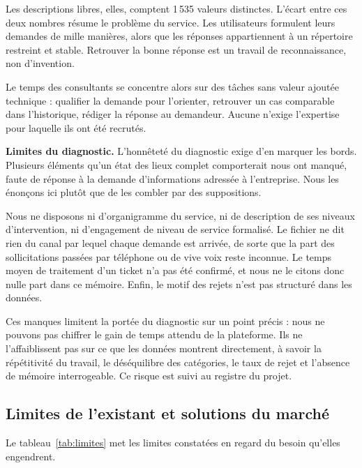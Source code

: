 Les descriptions libres, elles, comptent 1\,535 valeurs distinctes. L'écart entre ces deux nombres
résume le problème du service. Les utilisateurs formulent leurs demandes de mille manières, alors
que les réponses appartiennent à un répertoire restreint et stable. Retrouver la bonne réponse est
un travail de reconnaissance, non d'invention.

Le temps des consultants se concentre alors sur des tâches sans valeur ajoutée technique :
qualifier la demande pour l'orienter, retrouver un cas comparable dans l'historique, rédiger la
réponse au demandeur. Aucune n'exige l'expertise pour laquelle ils ont été recrutés.

\textbf{Limites du diagnostic.} L'honnêteté du diagnostic exige d'en marquer les bords. Plusieurs éléments qu'un état des lieux
complet comporterait nous ont manqué, faute de réponse à la demande d'informations adressée à
l'entreprise. Nous les énonçons ici plutôt que de les combler par des suppositions.

Nous ne disposons ni d'organigramme du service, ni de description de ses niveaux d'intervention, ni
d'engagement de niveau de service formalisé. Le fichier ne dit rien du canal par lequel chaque
demande est arrivée, de sorte que la part des sollicitations passées par téléphone ou de vive voix
reste inconnue. Le temps moyen de traitement d'un ticket n'a pas été confirmé, et nous ne le citons
donc nulle part dans ce mémoire. Enfin, le motif des rejets n'est pas structuré dans les données.

Ces manques limitent la portée du diagnostic sur un point précis : nous ne pouvons pas chiffrer le
gain de temps attendu de la plateforme. Ils ne l'affaiblissent pas sur ce que les données montrent
directement, à savoir la répétitivité du travail, le déséquilibre des catégories, le taux de rejet
et l'absence de mémoire interrogeable. Ce risque est suivi au registre du projet.

\subsection{Limites de l'existant et solutions du marché}

Le tableau~\ref{tab:limites} met les limites constatées en regard du besoin qu'elles engendrent.

